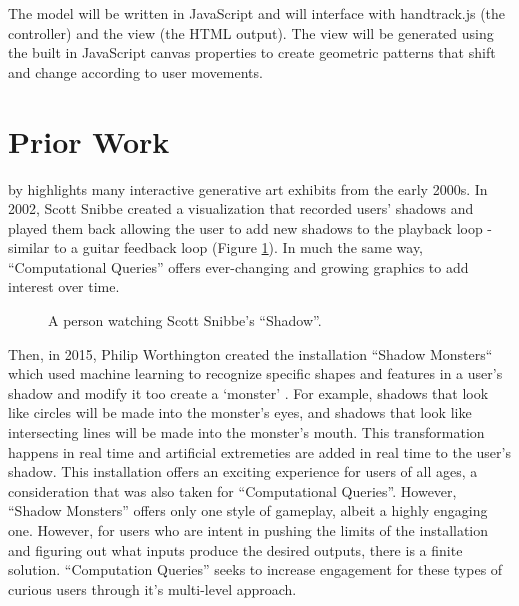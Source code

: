\documentclass[10pt,twocolumn]{article}
\begin{document}
The model will be written in JavaScript and will interface with handtrack.js (the controller) and the view (the HTML output).  The view will be generated using the built in JavaScript canvas properties to create geometric patterns that shift and change according to user movements. 

\section{Prior Work}

 by \citeauthor{kwon_real-time_nodate} highlights many interactive generative art exhibits from the early 2000s. In 2002, Scott Snibbe created a visualization that recorded users' shadows and played them back allowing the user to add new shadows to the playback loop - similar to a guitar feedback loop (Figure \ref{fig:shadow-2002}).  In much the same way, ``Computational Queries'' offers ever-changing and growing graphics to add interest over time.  

\begin{figure}[hbh]
\begin{center}
\vspace{.5cm}
\caption{A person watching Scott Snibbe's ``Shadow''. }
\label{fig:shadow-2002}
\end{center}
\end{figure} 

Then, in 2015, Philip Worthington created the installation ``Shadow Monsters`` which used machine learning to recognize specific shapes and features in a user's shadow and modify it too create a `monster' \cite{houston_public_media_mfah_2015}.  For example, shadows that look like circles will be made into the monster's eyes, and shadows that look like intersecting lines will be made into the monster's mouth.  This transformation happens in real time and artificial extremeties are added in real time to the user's shadow.  This installation offers an exciting experience for users of all ages, a consideration that was also taken for ``Computational Queries''.  However, ``Shadow Monsters'' offers only one style of gameplay, albeit a highly engaging one.  However, for users who are intent in pushing the limits of the installation and figuring out what inputs produce the desired outputs, there is a finite solution.  ``Computation Queries'' seeks to increase engagement for these types of curious users through it's multi-level approach. 
\end{document}
